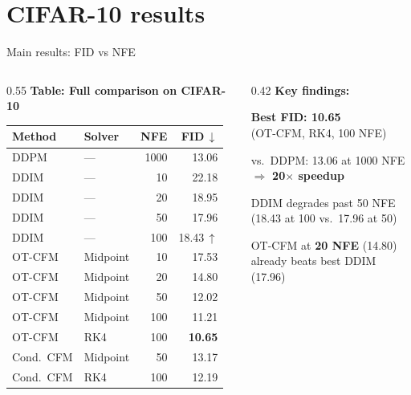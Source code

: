 \documentclass[aspectratio=169,10pt]{beamer}
\begin{document}
\section{CIFAR-10 results}

\begin{frame}{Main results: FID vs NFE}
\begin{columns}[T]
\begin{column}{0.55\textwidth}
\centering
{\small \textbf{Table: Full comparison on CIFAR-10}}\\[0.3em]
\scriptsize
\begin{tabular}{@{}llrr@{}}
\toprule
\textbf{Method} & \textbf{Solver} & \textbf{NFE} & \textbf{FID}\,$\downarrow$ \\
\midrule
DDPM & --- & 1000 & 13.06 \\
\midrule
DDIM & --- & 10 & 22.18 \\
DDIM & --- & 20 & 18.95 \\
DDIM & --- & 50 & 17.96 \\
DDIM & --- & 100 & \alert{18.43\,$\uparrow$} \\
\midrule
OT-CFM & Midpoint & 10 & 17.53 \\
OT-CFM & Midpoint & 20 & 14.80 \\
OT-CFM & Midpoint & 50 & 12.02 \\
OT-CFM & Midpoint & 100 & 11.21 \\
OT-CFM & RK4 & 100 & {\color{green}\textbf{10.65}} \\
\midrule
Cond.\ CFM & Midpoint & 50 & 13.17 \\
Cond.\ CFM & RK4 & 100 & 12.19 \\
\bottomrule
\end{tabular}
\end{column}
\begin{column}{0.42\textwidth}
\textbf{Key findings:}

\vspace{0.5em}
\textbf{Best FID: 10.65}\\
(OT-CFM, RK4, 100 NFE)

\vspace{0.5em}
vs.\ DDPM: 13.06 at 1000 NFE\\
$\Rightarrow$ \textbf{20$\times$ speedup}

\vspace{0.5em}
\alert{DDIM degrades} past 50 NFE\\
(18.43 at 100 vs.\ 17.96 at 50)

\vspace{0.5em}
OT-CFM at \textbf{20 NFE} (14.80)\\
already beats best DDIM (17.96)
\end{column}
\end{columns}
\end{frame}
\end{document}
